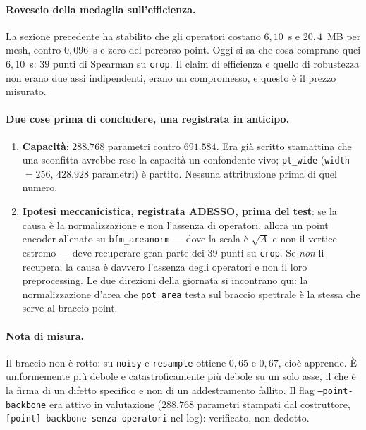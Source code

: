 \documentclass[11pt,a4paper]{article}
\begin{document}
\paragraph{Rovescio della medaglia sull'efficienza.} La sezione precedente ha stabilito che gli
operatori costano $6{,}10$~s e $20{,}4$~MB per mesh, contro $0{,}096$~s e zero del percorso
point. Oggi si sa che cosa comprano quei $6{,}10$~s: $39$ punti di Spearman su \texttt{crop}.
Il claim di efficienza e quello di robustezza non erano due assi indipendenti, erano un
compromesso, e questo \`e il prezzo misurato.

\paragraph{Due cose prima di concludere, una registrata in anticipo.}
\begin{enumerate}
\item \textbf{Capacit\`a}: $288{.}768$ parametri contro $691{.}584$. Era gi\`a scritto stamattina
che una sconfitta avrebbe reso la capacit\`a un confondente vivo; \texttt{pt\_wide}
(\texttt{width}$=256$, $428{.}928$ parametri) \`e partito. Nessuna attribuzione prima di quel
numero.
\item \textbf{Ipotesi meccanicistica, registrata ADESSO, prima del test}: se la causa \`e la
normalizzazione e non l'assenza di operatori, allora un point encoder allenato su
\texttt{bfm\_areanorm} --- dove la scala \`e $\sqrt{A}$ e non il vertice estremo --- deve
recuperare gran parte dei $39$ punti su \texttt{crop}. Se \emph{non} li recupera, la causa \`e
davvero l'assenza degli operatori e non il loro preprocessing. Le due direzioni della giornata
si incontrano qui: la normalizzazione d'area che \texttt{pot\_area} testa sul braccio spettrale
\`e la stessa che serve al braccio point.
\end{enumerate}

\paragraph{Nota di misura.} Il braccio non \`e rotto: su \texttt{noisy} e \texttt{resample}
ottiene $0{,}65$ e $0{,}67$, cio\`e apprende. \`E uniformemente pi\`u debole e catastroficamente
pi\`u debole su un solo asse, il che \`e la firma di un difetto specifico e non di un
addestramento fallito. Il flag \texttt{--point-backbone} era attivo in valutazione
($288{.}768$ parametri stampati dal costruttore, \texttt{[point] backbone senza operatori} nel
log): verificato, non dedotto.
\end{document}
